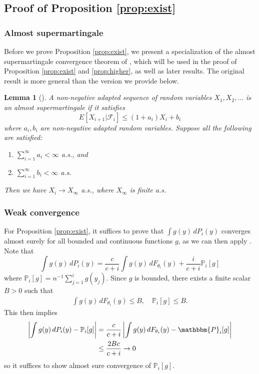 \documentclass[11pt,a4paper]{article}
\theoremstyle{plain}
\newtheorem{lemma}{Lemma}
\theoremstyle{remark}
\theoremstyle{remark}
\begin{document}
\subsection{Proof of Proposition \ref{prop:exist}}
\subsubsection{Almost supermartingale}
Before we prove Proposition \ref{prop:exist}, we present a specialization of the almost supermartingale convergence theorem of \citet{robbins1971convergence}, which will be used in the proof of Proposition \ref{prop:exist} and \ref{prop:higher}, as well as later results. The original result is more general than the version we provide below.

\begin{lemma} [\citet{robbins1971convergence}]
    A non-negative adapted sequence of random variables $X_1,X_2,\ldots$ is an almost supermartingale if it satisfies
    $$E[X_{i+1}|\mathcal{F}_{i}]\leq (1+a_i)X_{i}+b_i$$
    where $a_i, b_i$ are non-negative adapted random variables. 
    Suppose all the following are satisfied:
    \begin{enumerate}
        \item $\sum_{i=1}^\infty a_i<\infty$ a.s., and 
        \item $\sum_{i=1}^\infty b_i<\infty$ a.s.
    \end{enumerate}
    Then we have $X_i{\to} X_\infty$ a.s., where $ X_\infty$ is finite a.s.
    \label{lemma:Convergence theorem of almost-supermartingale}
\end{lemma}

\subsubsection{Weak convergence}
For Proposition \ref{prop:exist}, it suffices to prove that $\int g(y)\,dP_i(y)$ converges almost surely for all bounded and continuous functions $g$, as we can then apply  \citet[Theorem 2.2]{berti2006almost}. 
    Note that 
    $$\int g(y)\,dP_i(y)=\frac{c}{c+i}\int g(y)\,dF_{\theta_i}(y)+\frac{i}{c+i}\mathbb{P}_i[g]$$
    where $\mathbb{P}_i[g] = n^{-1}\sum_{j = 1}^i g(y_j)$. Since $g$ is bounded, there exists a finite scalar $B>0$ such that
\begin{align*}
    \int g(y)\, dF_{\theta_i}(y) \leq B, \quad \mathbb{P}_i[g] \leq B.
\end{align*}
This then implies
\begin{align*}
\left|\int g(y)\,dP_i(y) - \mathbb{P}_i[g] \right|&=\frac{c}{c+i}\left|\int g(y)\, dF_{\theta_i}(y) - \mathbbm{P}_i[g]\right|\\
&\leq \frac{2Bc}{c+i}\to 0 
\end{align*}
so it suffices to show almost sure convergence of $\mathbb{P}_i[g]$. 
\end{document}
